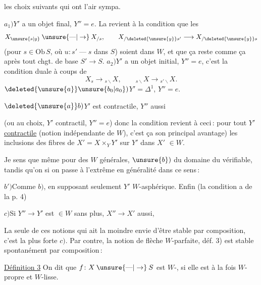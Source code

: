  les choix suivants qui ont l'air sympa.


$a_1)$\quad $Y'$ a un objet final, $Y''=e$. La  revient  à la condition que les
\[
X_{\unsure{s|y}}\mathbin{\unsure{\text{---}|\to}}X_{/s},\qquad X_{/\deleted{\unsure{y}}s'}\longrightarrow X_{/\deleted{\unsure{y}}s}
\]
(pour $s\in\mathrm{Ob}\,S$, où $u\colon s'\mathbin{\text{---}}s$ dans $S$) soient dans $W$, et que ça reste comme ça après tout chgt. de base $S'\to S$.
$a_2)$\quad $Y'$ a un objet initial, $Y''=e$, c'est la condition duale à coups de
\[
X_s\longrightarrow{}_{s\backslash}X,\qquad{}_{s\backslash}X\longrightarrow{}_{s'\backslash}X.
\]
$\deleted{\unsure{a}}\unsure{b_0|a_0})$\quad $Y'=\mathbb{\Delta}^1$, $Y''=e$.

$\deleted{\unsure{a}}b)$\quad $Y'$ est contractile, $Y''$ aussi

(ou au choix, $Y'$ contractil, $Y''=e$) donc la condition revient à ceci\,: pour tout $Y'$  \uline{contractile} (notion indépendante de $W$), c'est ça son principal avantage) les inclusions des fibres de $X'=X\times_Y Y'$ sur $Y'$ dans $X'$  $\in W$.

Je sens que même pour des $W$ générales, $\unsure{b})$  du domaine du vérifiable, tandis qu'on  si on passe à l'extrême en généralité dans ce sens\,:

$b')$\quad Comme $b)$,   en supposant seulement $Y'$ $W$-asphérique.
Enfin (la condition a de la p. 4)

$c)$\quad Si $Y''\to Y'$ est $\in W$  sans plus, $X''\to X'$ aussi,


La seule de ces notions qui ait la moindre envie d'être stable par composition, c'est la plus forte $c)$. Par contre, la notion de flèche $W$-parfaite,  déf. 3) est stable spontanément par composition\,:

\uline{Définition 3} On dit que $f\colon X\mathbin{\unsure{\text{---}|\to}}S$ est $W$-, si elle est à la fois $W$-propre et $W$-lisse.

